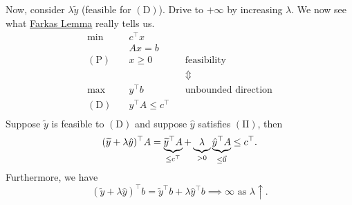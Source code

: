 \begin{remark}
	Now, consider \(\lambda \widetilde{y}\) (feasible for \((\mathrm{D})\)). Drive to \(+\infty \) by increasing \(\lambda\). We now see what \hyperref[lma:Farkas]{Farkas Lemma} really tells us.
	\[
		\begin{aligned}
			\min~             & c^{\top} x                                               \\
			                  & Ax = b                                                   \\
			(\mathrm{P})\quad & x\geq 0                  &  & \text{feasibility}         \\
			                  &                          &  & \Updownarrow               \\
			\max~             & y^{\top}b                &  & \text{unbounded direction} \\
			(\mathrm{D})\quad & y^{\top} A \leq c^{\top}                                 \\
		\end{aligned}
	\]
	Suppose \(\widetilde{y}\) is feasible to \((\mathrm{D})\) and suppose \(\hat{y}\) satisfies \((\mathrm{II})\), then
	\[
		(\widetilde{y}+\lambda \hat{y})^{\top} A = \underbrace{\widetilde{y}^{\top}A}_{\leq c^{\top}} + \underbrace{\vphantom{y}\lambda}_{>0} \underbrace{\hat{y}^{\top} A}_{\leq \vec{0}} \leq c^{\top}.
	\]
	Furthermore, we have
	\[
		(\widetilde{y}+\lambda \hat{y})^{\top} b = \widetilde{y}^{\top} b+\lambda \hat{y}^{\top} b \implies \infty \text{ as } \lambda \uparrow  .
	\]
\end{remark}

